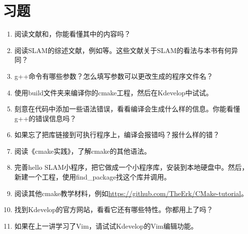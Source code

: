 \section*{习题}
\begin{enumerate}
	\item 阅读文献\cite{Liu2016}和\cite{Liang2013}，你能看懂其中的内容吗？
	\item[\optional] 阅读SLAM的综述文献，例如\cite{Cadena2016, Fuentes-Pacheco2015, Boal2014, Chen2012, Chen2007}等。这些文献关于SLAM的看法与本书有何异同？
	\item g++命令有哪些参数？怎么填写参数可以更改生成的程序文件名？
	\item 使用build文件夹来编译你的cmake工程，然后在Kdevelop中试试。
	\item 刻意在代码中添加一些语法错误，看看编译会生成什么样的信息。你能看懂g++的错误信息吗？
	\item 如果忘了把库链接到可执行程序上，编译会报错吗？报什么样的错？
	\item[\optional] 阅读《cmake实践》，了解cmake的其他语法。
	\item[\optional] 完善hello SLAM小程序，把它做成一个小程序库，安装到本地硬盘中。然后，新建一个工程，使用find\_package找这个库并调用。
	\item[\optional] 阅读其他cmake教学材料，例如\url{https://github.com/TheErk/CMake-tutorial}。
	\item 找到Kdevelop的官方网站，看看它还有哪些特性。你都用上了吗？
	\item 如果在上一讲学习了Vim，请试试Kdevelop的Vim编辑功能。
\end{enumerate}